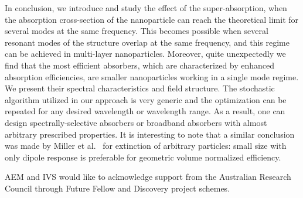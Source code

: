 \documentclass[aps,prl,twocolumn,showpacs,superscriptaddress,groupedaddress]{revtex4-1}
\begin{document}
In conclusion, we introduce and study the effect of the super-absorption, when the
absorption cross-section of the nanoparticle can reach the theoretical
limit for several modes at the same frequency. This becomes possible when several resonant modes of the
structure overlap at the same frequency, and this regime can be achieved in multi-layer nanoparticles. Moreover, quite unexpectedly we find that the most efficient absorbers, which are characterized by
enhanced absorption efficiencies, are smaller nanoparticles working in
a single mode regime. We present their spectral characteristics and
field structure.  The stochastic algorithm utilized in our approach is
very generic and the optimization can be repeated for any desired
wavelength or wavelength range.  As a result, one can design
spectrally-selective absorbers or broadband absorbers with almost
arbitrary prescribed properties.  It is interesting to note
that a similar conclusion was made by Miller et al.~\cite{Miller-2014}
for extinction of arbitrary particles: small size with only dipole
response is preferable for geometric volume normalized efficiency.


\begin{acknowledgments}

 AEM and IVS would like to acknowledge support from the Australian Research Council through Future Fellow and Discovery project schemes. 
\end{acknowledgments}


\end{document}
